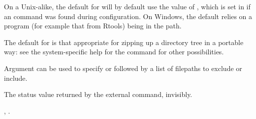 %
\begin{Details}\relax
On a Unix-alike, the default for  will by default use the
value of , which is set in  if an
 command was found during configuration.  On Windows, the
default relies on a  program (for example that from
Rtools) being in the path.

The default for  is that appropriate for zipping up a
directory tree in a portable way: see the system-specific help for the
 command for other possibilities.

Argument  can be used to specify  or 
followed by a list of filepaths to exclude or include.
\end{Details}
%
\begin{Value}
The status value returned by the external command, invisibly.
\end{Value}
%
\begin{SeeAlso}\relax
{}, .
\end{SeeAlso}
\clearpage
